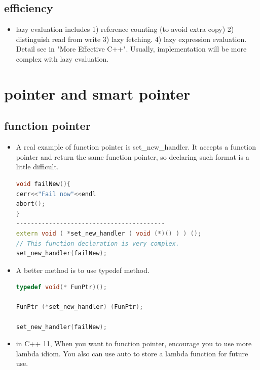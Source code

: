 \documentclass[a4paper,12pt,twoside]{book}
\begin{document}
\subsection{efficiency}
\begin{itemize}
\item  lazy evaluation includes 1) reference counting (to avoid extra copy) 2) distinguish read from write 3) lazy fetching. 4) lazy expression evaluation. Detail see in "More Effective C++". Usually, implementation will be  more complex with lazy evaluation.

\end{itemize}


\section{pointer and smart pointer}

\subsection{function pointer}
\begin{itemize}

\item A real example of function pointer is set\_new\_handler. It accepts a function pointer and return the same function pointer, so declaring such format is a little difficult.
\begin{lstlisting}[frame=single, language=c++]
void failNew(){
cerr<<"Fail now"<<endl
abort();
}
-----------------------------------------
extern void ( *set_new_handler ( void (*)() ) ) ();
// This function declaration is very complex.
set_new_handler(failNew);
\end{lstlisting}

\item A better method is to use typedef method.
\begin{lstlisting}[frame=single, language=c++]
typedef void(* FunPtr)();

FunPtr (*set_new_handler) (FunPtr);

set_new_handler(failNew);
\end{lstlisting}

\item in C++ 11, When you want to function pointer, encourage you to use more lambda idiom. You also can use auto to store a lambda function for future use.
\end{itemize}
\end{document}
